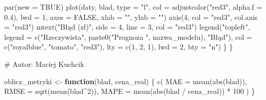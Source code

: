 \documentclass[
  polish,
  letterpaper,
  DIV=11,
  numbers=noendperiod]{scrartcl}
\newenvironment{Shaded}{\begin{snugshade}}{\end{snugshade}}
\newcommand{\AttributeTok}[1]{\textcolor[rgb]{0.40,0.45,0.13}{#1}}
\newcommand{\CommentTok}[1]{\textcolor[rgb]{0.37,0.37,0.37}{#1}}
\newcommand{\ConstantTok}[1]{\textcolor[rgb]{0.56,0.35,0.01}{#1}}
\newcommand{\ControlFlowTok}[1]{\textcolor[rgb]{0.00,0.23,0.31}{\textbf{#1}}}
\newcommand{\DecValTok}[1]{\textcolor[rgb]{0.68,0.00,0.00}{#1}}
\newcommand{\FloatTok}[1]{\textcolor[rgb]{0.68,0.00,0.00}{#1}}
\newcommand{\FunctionTok}[1]{\textcolor[rgb]{0.28,0.35,0.67}{#1}}
\newcommand{\NormalTok}[1]{\textcolor[rgb]{0.00,0.23,0.31}{#1}}
\newcommand{\OtherTok}[1]{\textcolor[rgb]{0.00,0.23,0.31}{#1}}
\newcommand{\SpecialCharTok}[1]{\textcolor[rgb]{0.37,0.37,0.37}{#1}}
\newcommand{\StringTok}[1]{\textcolor[rgb]{0.13,0.47,0.30}{#1}}
\begin{document}
\begin{Shaded}
\begin{Highlighting}[]
    \FunctionTok{par}\NormalTok{(}\AttributeTok{new =} \ConstantTok{TRUE}\NormalTok{)}
    \FunctionTok{plot}\NormalTok{(daty, blad, }\AttributeTok{type =} \StringTok{"l"}\NormalTok{, }\AttributeTok{col =} \FunctionTok{adjustcolor}\NormalTok{(}\StringTok{"red3"}\NormalTok{, }\AttributeTok{alpha.f =} \FloatTok{0.4}\NormalTok{),}
         \AttributeTok{lwd =} \DecValTok{1}\NormalTok{, }\AttributeTok{axes =} \ConstantTok{FALSE}\NormalTok{, }\AttributeTok{xlab =} \StringTok{""}\NormalTok{, }\AttributeTok{ylab =} \StringTok{""}\NormalTok{)}
    \FunctionTok{axis}\NormalTok{(}\DecValTok{4}\NormalTok{, }\AttributeTok{col =} \StringTok{"red3"}\NormalTok{, }\AttributeTok{col.axis =} \StringTok{"red3"}\NormalTok{)}
    \FunctionTok{mtext}\NormalTok{(}\StringTok{"Błąd (zł)"}\NormalTok{, }\AttributeTok{side =} \DecValTok{4}\NormalTok{, }\AttributeTok{line =} \DecValTok{3}\NormalTok{, }\AttributeTok{col =} \StringTok{"red3"}\NormalTok{)}
    \FunctionTok{legend}\NormalTok{(}\StringTok{"topleft"}\NormalTok{,}
           \AttributeTok{legend =} \FunctionTok{c}\NormalTok{(}\StringTok{"Rzeczywista"}\NormalTok{, }\FunctionTok{paste0}\NormalTok{(}\StringTok{"Prognoza "}\NormalTok{, nazwa\_modelu), }\StringTok{"Błąd"}\NormalTok{),}
           \AttributeTok{col =} \FunctionTok{c}\NormalTok{(}\StringTok{"royalblue"}\NormalTok{, }\StringTok{"tomato"}\NormalTok{, }\StringTok{"red3"}\NormalTok{),}
           \AttributeTok{lty =} \FunctionTok{c}\NormalTok{(}\DecValTok{1}\NormalTok{, }\DecValTok{2}\NormalTok{, }\DecValTok{1}\NormalTok{), }\AttributeTok{lwd =} \DecValTok{2}\NormalTok{, }\AttributeTok{bty =} \StringTok{"n"}\NormalTok{)}
\NormalTok{  \}}
\NormalTok{\}}
\end{Highlighting}
\end{Shaded}

\begin{Shaded}
\begin{Highlighting}[]
\CommentTok{\# Autor: Maciej Kuchcik}

\NormalTok{oblicz\_metryki }\OtherTok{\textless{}{-}} \ControlFlowTok{function}\NormalTok{(blad, cena\_real) \{}
  \FunctionTok{c}\NormalTok{(}
    \AttributeTok{MAE  =} \FunctionTok{mean}\NormalTok{(}\FunctionTok{abs}\NormalTok{(blad)),}
    \AttributeTok{RMSE =} \FunctionTok{sqrt}\NormalTok{(}\FunctionTok{mean}\NormalTok{(blad}\SpecialCharTok{\^{}}\DecValTok{2}\NormalTok{)),}
    \AttributeTok{MAPE =} \FunctionTok{mean}\NormalTok{(}\FunctionTok{abs}\NormalTok{(blad }\SpecialCharTok{/}\NormalTok{ cena\_real)) }\SpecialCharTok{*} \DecValTok{100}
\NormalTok{  )}
\NormalTok{\}}
\end{Highlighting}
\end{Shaded}
\end{document}
